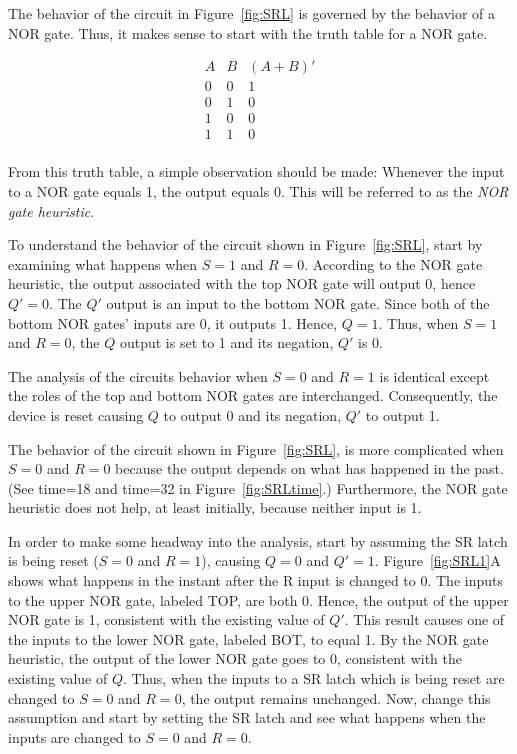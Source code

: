 The behavior of the circuit in Figure~\ref{fig:SRL} is governed
by the behavior of a NOR gate.  Thus, it makes sense to start with
the truth table for a NOR gate.

$$\begin{array}{c|c||c}
A  & B  & (A+B)'  \\ \hline
0  & 0  & 1  \\ \hline
0  & 1  & 0  \\ \hline
1  & 0  & 0  \\ \hline
1  & 1  & 0  \\ 
\end{array}$$

From this truth table, a simple observation should be made:  
Whenever the input to a NOR gate equals 1, the output equals 0.
This will be referred to as the {\it NOR gate heuristic}.

To understand the behavior of the circuit shown in 
Figure~\ref{fig:SRL}, start by examining what happens when 
$S=1$ and $R=0$.  According to the NOR gate heuristic, the output
associated with the top NOR gate will output 0, hence $Q'=0$.  
The $Q'$ output is an input to the bottom NOR gate.  Since both
of the bottom NOR gates' inputs are 0, it outputs 1.  Hence, 
$Q=1$.  Thus, when $S=1$ and $R=0$, the $Q$ output is set to 1 and 
its negation, $Q'$ is 0.

The analysis of the circuits behavior when $S=0$ and $R=1$ is
identical except the roles of the top and bottom NOR gates
are interchanged.  Consequently, the device is reset causing
$Q$ to output 0 and its negation, $Q'$ to output 1.

The behavior of the circuit shown in Figure~\ref{fig:SRL},
is more complicated when $S=0$ and $R=0$ because the output 
depends on what has happened in the past. (See time=18 and time=32
in Figure~\ref{fig:SRLtime}.)  Furthermore, the NOR gate 
heuristic does not help, at least initially, because neither 
input is 1.  

In order to make some headway into the analysis, start
by assuming the SR latch is being reset ($S=0$ and $R=1$),
causing $Q=0$ and $Q'=1$.  Figure~\ref{fig:SRL1}A shows what 
happens in the instant after the R input is changed to 0.
The inputs to the upper NOR gate, labeled TOP, are both 0.
Hence, the output of the upper NOR gate is 1, consistent with 
the existing value of $Q'$.  This result causes one of the inputs to
the lower NOR gate, labeled BOT, to equal 1.  By the NOR
gate heuristic, the output of the lower NOR gate goes to 0,
consistent with the existing value of $Q$.  Thus, when the
inputs to a SR latch which is being reset are changed to 
$S=0$ and $R=0$, the output remains unchanged.  Now, change this
assumption and start by setting the SR latch and see what happens
when the inputs are changed to $S=0$ and $R=0$.

